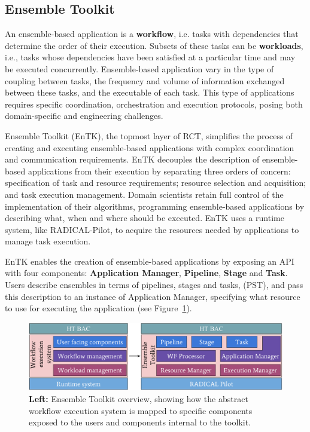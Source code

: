 \subsection{Ensemble Toolkit}\label{ssec:entk}

An ensemble-based application is a \textbf{workflow}, i.e. tasks
with dependencies that determine the order of their execution. Subsets of
these tasks can be \textbf{workloads}, i.e., tasks whose dependencies have
been satisfied at a particular time and may be executed concurrently.
Ensemble-based application vary in the type of coupling between tasks, the
frequency and volume of information exchanged between these tasks, and the
executable of each task. This type of applications requires specific
coordination, orchestration and execution protocols, posing both
domain-specific and engineering challenges.

Ensemble Toolkit (EnTK), the topmost layer of RCT, simplifies the process of
creating and executing ensemble-based applications with complex coordination
and communication requirements. EnTK decouples the description of
ensemble-based applications from their execution by separating three orders
of concern: specification of task and resource requirements; resource
selection and acquisition; and task execution management. Domain scientists
retain full control of the implementation of their algorithms, programming
ensemble-based applications by describing what, when and where should be
executed. EnTK uses a runtime system, like RADICAL-Pilot, to acquire the
resources needed by applications to manage task execution.

EnTK enables the creation of ensemble-based applications by exposing an API
with four components: \textbf{Application Manager}, \textbf{Pipeline},
\textbf{Stage} and \textbf{Task}. Users describe ensembles in terms of
pipelines, stages and tasks, (PST), and pass this description to an instance
of Application Manager, specifying what resource to use for executing the
application (see Figure~\ref{fig:entk_arch}).

\begin{figure}
  \centering
  \includegraphics[width=\columnwidth]{FIGURES/entk_overview.pdf}
  \caption{\textbf{Left:} Ensemble Toolkit overview, showing how the abstract
           workflow execution system is mapped to specific components exposed
           to the users and components internal to the
           toolkit.}\label{fig:entk_arch}
\end{figure}


